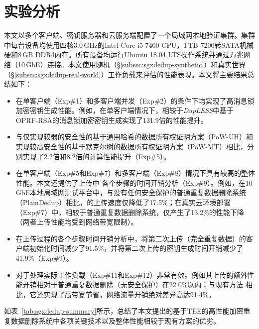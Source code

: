 \section{实验分析}
\label{sec:sgxdedup-evaluation}

本文以多个客户端、密钥服务器和云服务端配置了一个局域网本地验证集群。集群中每台设备均使用四核3.0\,GHz的Intel Core i5-7400 CPU，1\,TB 7200转SATA机械硬和8\,GB DDR4内存。所有设备均运行Ubuntu 18.04 LTS操作系统并通过万兆网络（10\,GbE）连接。本文使用随机（\S\ref{subsec:sgxdedup-synthetic}）和真实世界（\S\ref{subsec:sgxdedup-real-world}）工作负载来评估\sysnameS 的性能表现。本文将主要结果总结如下：

\begin{itemize}
    \item \sysnameS 在单客户端（Exp\#1）和多客户端并发（Exp\#2）的条件下均实现了高消息锁加密密钥生成性能。例如，在单客户端情况下，相较于{\em DupLESS}\cite{bellare2013DupLESS}中基于OPRF-RSA的消息锁加密密钥生成实现了131.9倍的性能提升。
    \item \sysnameS 与仅实现较弱的安全性的基于通用哈希的数据所有权证明方案（PoW-UH）\cite{xu2013weak}和实现较高安全性的基于默克尔树的数据所有权证明方案（PoW-MT）\cite{halevi11}相比，分别实现了2.2倍和8.2倍的计算性能提升（Exp\#5）。
    \item \sysnameS 在单客户端（Exp\#5和Exp\#7）和多客户端（Exp\#8）情况下具有较高的整体性能。本文还提供了上传中 \sysnameS 各个步骤的时间开销分析（Exp\#9）。例如，在10\,GbE本地局域网测试平台中，与没有任何安全保护的普通重复数据删除系统（PlainDedup）相比，\sysnameS 的上传速度仅降低了17.5\%；在真实云环境部署（Exp\#7）中，相较于普通重复数据删除系统，\sysnameS 仅产生了13.2\%的性能下降（两者上传性能均受到网络带宽限制）。
    \item 在上传过程的各个步骤时间开销分析中，\sysnameS 将第二次上传（完全重复数据）的客户端初始化时间减少了91.5\%，并将第二次上传的密钥生成时间开销减少了41.9\%（Exp\#9）。
    \item \sysnameS 对于处理实际工作负载（Exp\#11和Exp\#12）非常有效。例如其上传的额外性能开销相对于普通重复数据删除（无安全保护）在22.0\%以内；与现有方法\cite{li15,harnik2010side} 相比，它还实现了高带宽节省，网络流量开销绝对差异高达91.4\%。
\end{itemize}

如表~\ref{tab:sgxdedup-summary}所示，总结了本文提出的基于TEE的高性能加密重复数据删除系统\sysnameS 中各项关键技术以及整体性能相较于现有方案的优劣。

